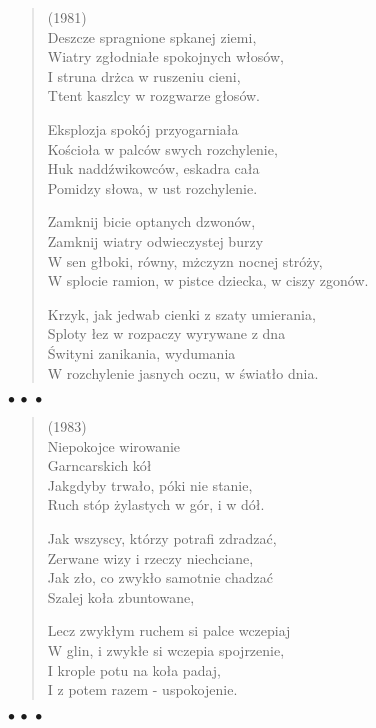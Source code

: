 \documentclass{article} %
\newenvironment{wierszd}[2]
	{\begin{verse} \hspace*{-1em}{\bf #1}\hfill{\small{(#2)}}\\[.5ex] }
	{\end{verse} \begin{center}$\bullet\ \bullet\ \bullet$\end{center}}
\newcommand{\e}{\eob}
\renewcommand{\a}{\aob}
\renewcommand{\o}{\'{o}}
\newcommand{\z}{\'{z}}
\newcommand{\s}{\'{s}}
\renewcommand{\S}{\'{S}}
\newcommand{\ci}{\'{c}}
\begin{document}
\begin{wierszd}{}{1981}

Deszcze spragnione sp{\e}kanej ziemi, \\ 
Wiatry zg{\l}odnia{\l}e spokojnych w{\l}os{\o}w, \\ 
I struna dr\.{z}{\a}ca w ruszeniu cieni, \\ 
T{\e}tent kaszl{\a}cy w rozgwarze g{\l}os{\o}w. 

	Eksplozja spok{\o}j przyogarnia{\l}a \\ 
	Ko{\s}cio{\l}a w palc{\o}w swych rozchylenie, \\ 
	Huk nadd{\z}wi{\e}kowc{\o}w, eskadra ca{\l}a \\ 
	Pomi{\e}dzy s{\l}owa, w ust rozchylenie. 
 
Zamknij bicie op{\e}tanych dzwon{\o}w, \\ 
Zamknij wiatry odwieczystej burzy \\ 
W sen g{\l}{\e}boki, r{\o}wny, m{\e}\.{z}czyzn nocnej str{\o}\.{z}y, \\ 
W splocie ramion, w pi{\a}stce dziecka, w ciszy zgon{\o}w. 

	Krzyk, jak jedwab cienki z szaty umierania, \\ 
	Sploty {\l}ez w rozpaczy wyrywane z dna \\ 
	{\S}wi{\a}tyni zanikania, wydumania \\ 
	W rozchylenie jasnych oczu, w {\s}wiat{\l}o dnia.

\end{wierszd}

\newpage
\begin{wierszd}{}{1983}
Niepokoj{\a}ce wirowanie  \\ 
Garncarskich k{\o}{\l} \\ 
Jakgdyby trwa{\l}o, p{\o}ki nie stanie, \\ 
Ruch st{\o}p \.{z}ylastych w g{\o}r{\e}, i w d{\o}{\l}. 
 
	Jak wszyscy, kt{\o}rzy potrafi{\a} zdradza{\ci}, \\ 
	Zerwane wi{\e}zy i rzeczy niechciane, \\ 
	Jak z{\l}o, co zwyk{\l}o samotnie chadza{\ci} \\ 
	Szalej{\a} ko{\l}a zbuntowane, 

Lecz zwyk{\l}ym ruchem si{\e} palce wczepiaj{\a} \\ 
W glin{\e}, i zwyk{\l}e si{\e} wczepia spojrzenie, \\ 
I krople potu na ko{\l}a padaj{\a}, \\ 
I z potem razem - uspokojenie.

\end{wierszd}
\end{document}
